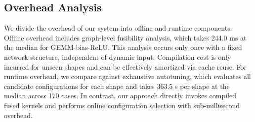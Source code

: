 %

\subsection{Overhead Analysis}
\label{sec:overhead}

We divide the overhead of our system into offline and runtime components.
Offline overhead includes graph-level fusibility analysis, which takes 244.0 ms
at the median for GEMM-bias-ReLU. This analysis occurs only once with a fixed network structure, independent of dynamic input.
Compilation cost is only incurred for unseen shapes and can be effectively amortized via cache reuse.
For runtime overhead, 
we compare against exhaustive autotuning, which
evaluates all candidate configurations for each shape and takes 363.5 s per
shape at the median across 170 cases. In contrast, our approach directly invokes compiled fused kernels and performs online configuration selection with sub-millisecond overhead.

